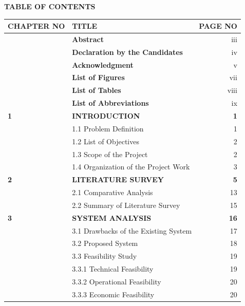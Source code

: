 \newpage
\begin{center}
{\Large \textbf{TABLE OF CONTENTS}}\\[4mm]
\end{center}
\setlength{\tabcolsep}{4pt}
\begin{tabular}{p{3.2cm} p{10.2cm} r}
\hline
\textbf{CHAPTER NO} & \textbf{TITLE} & \textbf{PAGE NO} \\[1.5mm]
\hline
& \textbf{Abstract} & \hspace{0.5cm} iii \\[1mm]
& \textbf{Declaration by the Candidates} & \hspace{0.5cm} iv \\[1mm]
& \textbf{Acknowledgment} & \hspace{0.5cm} v \\[1mm]
& \textbf{List of Figures} & \hspace{0.5cm} vii \\[1mm]
& \textbf{List of Tables} & \hspace{0.5cm} viii \\[1mm]
& \textbf{List of Abbreviations} & \hspace{0.5cm} ix \\[1.5mm]

\centering \textbf{1} & \textbf{INTRODUCTION} & \textbf{1} \\[1mm]
& 1.1 Problem Definition & 1 \\[1mm]
& 1.2 List of Objectives & 2 \\[1mm]
& 1.3 Scope of the Project & 2 \\[1mm]
& 1.4 Organization of the Project Work & 3 \\[1.5mm]

\centering \textbf{2} & \textbf{LITERATURE SURVEY} & \textbf{5} \\[1mm]
& 2.1 Comparative Analysis & 13 \\[1mm]
& 2.2 Summary of Literature Survey & 15 \\[1.5mm]

\centering \textbf{3} & \textbf{SYSTEM ANALYSIS} & \textbf{16} \\[1mm]
& 3.1 Drawbacks of the Existing System & 17 \\[1mm]
& 3.2 Proposed System & 18 \\[1mm]
& 3.3 Feasibility Study & 19 \\[1mm]
& \hspace{0.4cm} 3.3.1 Technical Feasibility & 19 \\[1mm]
& \hspace{0.4cm} 3.3.2 Operational Feasibility & 20 \\[1mm]
& \hspace{0.4cm} 3.3.3 Economic Feasibility & 20 \\[1.5mm]


\end{tabular}
